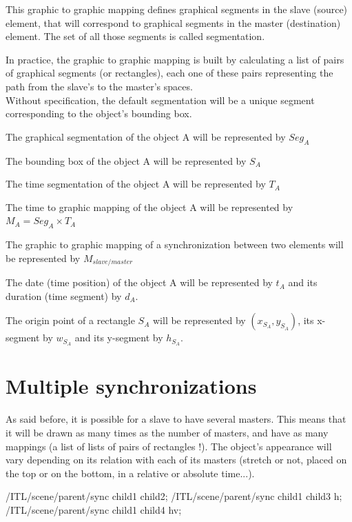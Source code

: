 \documentclass[a4paper]{article}
\newenvironment{inscore}	{\vspace{-2mm}\small\verbatim}{\endverbatim\vspace{-2mm}}
\begin{document}
This graphic to graphic mapping defines graphical segments in the slave (source) element, that will correspond to graphical segments in the master (destination) element.
The set of all those segments is called segmentation. 

In practice, the graphic to graphic mapping is built by calculating a list of pairs of graphical segments (or rectangles), each one of these pairs representing the path from the slave's to the master's spaces.
\\

Without specification, the default segmentation will be a unique segment corresponding to the object's bounding box.

\bigskip

The graphical segmentation of the object A will be represented by $Seg_A$

The bounding box of the object A will be represented by $S_A$

The time segmentation of the object A will be represented by $T_A$

The time to graphic mapping of the object A will be represented by $M_A = Seg_A \times T_A$

The graphic to graphic mapping of a synchronization between two elements will be represented by $M_{slave/master}$

The date (time position) of the object A will be represented by $t_A$ and its duration (time segment) by $d_A$.

The origin point of a rectangle $S_A$ will be represented by $(x_{S_A} , y_{S_A})$, its x-segment by $w_{S_A}$ and its y-segment by $h_{S_A}$.


\section{Multiple synchronizations}\label{sec:multSync}

As said before, it is possible for a slave to have several masters. This means that it will be drawn as many times as the number of masters, and have as many mappings (a list of lists of pairs of rectangles !). The object's appearance will vary depending on its relation with each of its masters (stretch or not, placed on the top or on the bottom, in a relative or absolute time...).
\bigskip

\begin{inscore}
/ITL/scene/parent/sync child1 child2;
/ITL/scene/parent/sync child1 child3 h;
/ITL/scene/parent/sync child1 child4 hv;
\end{inscore}
\end{document}
